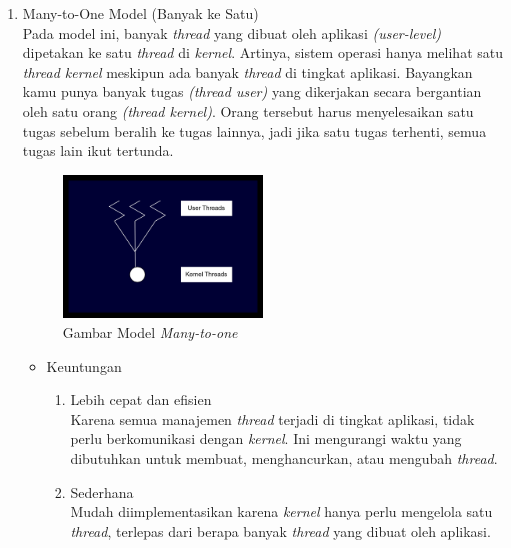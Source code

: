 \documentclass[12pt]{article}
\begin{document}
\begin{enumerate}
    \item Many-to-One Model (Banyak ke Satu)\\
    Pada model ini, banyak \textit{thread} yang dibuat oleh aplikasi \textit{(user-level)} dipetakan ke satu \textit{thread} di \textit{kernel}. Artinya, sistem operasi hanya melihat satu \textit{thread kernel} meskipun ada banyak \textit{thread} di tingkat aplikasi.
    Bayangkan kamu punya banyak tugas \textit{(thread user)} yang dikerjakan secara bergantian oleh satu orang \textit{(thread kernel)}. Orang tersebut harus menyelesaikan satu tugas sebelum beralih ke tugas lainnya, jadi jika satu tugas terhenti, semua tugas lain ikut tertunda.
    \begin{figure}[h]
        \centering
        \includegraphics[width=0.5\textwidth]{asset/gambar-model-multithreading-many-to-one.jpg}
        \caption{Gambar Model \textit{Many-to-one}}
    \end{figure}
    \begin{itemize}
        \item Keuntungan \\
            \begin{enumerate}
                \item Lebih cepat dan efisien \\
                    Karena semua manajemen \textit{thread} terjadi di tingkat aplikasi, tidak perlu 
                    berkomunikasi dengan \textit{kernel}. Ini mengurangi waktu yang dibutuhkan untuk membuat, menghancurkan, atau mengubah \textit{thread}.
                \item Sederhana \\
                    Mudah diimplementasikan karena \textit{kernel} hanya perlu mengelola satu \textit{thread}, terlepas dari berapa banyak \textit{thread} yang 
                    dibuat oleh aplikasi.
            \end{enumerate}


\end{itemize}
\end{enumerate}
\end{document}
